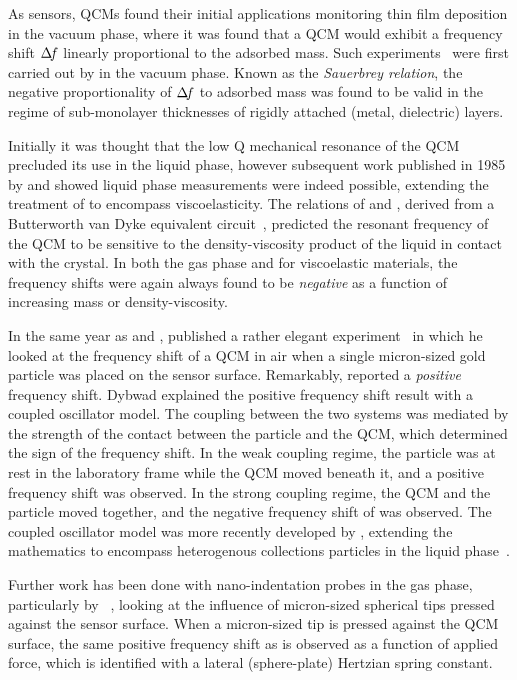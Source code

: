 As sensors, QCMs found their initial applications monitoring thin film
deposition in the vacuum phase, where it was found that a QCM would exhibit
a frequency shift $\Delta\!f$ linearly proportional to the adsorbed mass.  Such
experiments~\cite{sauerbrey1959verwendung} were first carried out by
 in the vacuum phase.  Known as the \textit{Sauerbrey
relation}, the negative proportionality of $\Delta\!f$ to adsorbed mass was found
to be valid in the regime of sub-monolayer thicknesses of rigidly attached
(metal, dielectric) layers.

Initially it was thought that the low Q mechanical resonance of the QCM
precluded its use in the liquid phase, however subsequent work published in
1985 by  and  showed liquid phase measurements
were indeed possible, extending the treatment of  to
encompass viscoelasticity.  The relations of  and
, derived from a Butterworth van Dyke equivalent
circuit~\cite{kanazawa1985frequency}, predicted the resonant frequency of
the QCM to be sensitive to the density-viscosity product of the liquid in
contact with the crystal.  In both the gas phase and for viscoelastic
materials, the frequency shifts were again always found to be
\textit{negative} as a function of increasing mass or density-viscosity.

In the same year as  and , 
published a rather elegant experiment~\cite{dybwad1985sensitive} in which
he looked at the frequency shift of a QCM in air when a single micron-sized
gold particle was placed on the sensor surface.  Remarkably, 
reported a \textit{positive} frequency shift.  Dybwad explained the
positive frequency shift result with a coupled oscillator model.  The
coupling between the two systems was mediated by the strength of the
contact between the particle and the QCM, which determined the sign of the
frequency shift.  In the weak coupling regime, the particle was at rest in
the laboratory frame while the QCM moved beneath it, and a positive
frequency shift was observed.  In the strong coupling regime, the QCM and
the particle moved together, and the negative frequency shift of
 was observed.  The coupled oscillator model was more
recently developed by , extending the mathematics to
encompass heterogenous collections particles in the liquid
phase~\cite{johannsman2007contacts}.

Further work has been done with nano-indentation probes in the gas phase,
particularly by ~\cite{borovsky2001measuring}, looking at
the influence of micron-sized spherical tips pressed against the sensor
surface.  When a micron-sized tip is pressed against the QCM surface, the
same positive frequency shift as  is observed as a function of
applied force, which is identified with a lateral (sphere-plate) Hertzian
spring constant.

